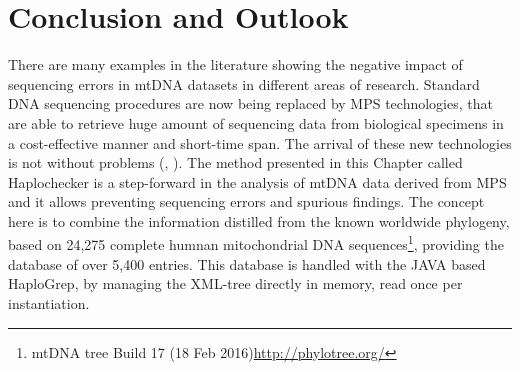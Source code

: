 \section{Conclusion and Outlook}\label{cont:outlook}
There are many examples in the literature showing the negative impact of sequencing errors in mtDNA datasets in different areas of research. Standard DNA sequencing procedures are now being replaced by MPS technologies, that are able to retrieve huge amount of sequencing data from biological specimens in a cost-effective manner and short-time span. The arrival of these new technologies is not without problems (\cite{Bandelt2012a}, \cite{Just2015}). The method presented in this Chapter called Haplochecker is a step-forward in the analysis of mtDNA data derived from MPS and it allows preventing sequencing errors and spurious findings. The concept here is to combine the information distilled from the known worldwide phylogeny, based on 24,275 complete humnan mitochondrial DNA sequences\footnote{mtDNA tree Build 17 (18 Feb 2016)\url{http://phylotree.org/}}, providing the database of over 5,400 entries. This database is handled with the JAVA based HaploGrep, by managing the XML-tree directly in memory, read once per instantiation. 

